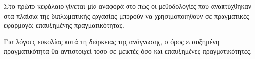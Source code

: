 Στο πρώτο κεφάλαιο γίνεται μία αναφορά στο πώς οι μεθοδολογίες που αναπτύχθηκαν στα πλαίσια της διπλωματικής εργασίας μπορούν να χρησιμοποιηθούν σε πραγματικές εφαρμογές επαυξημένης πραγματικότητας.


Για λόγους ευκολίας κατά τη διάρκειας της ανάγνωσης, ο όρος επαυξημένη πραγματικότητα θα αντιστοιχεί τόσο σε μεικτές όσο και επαυξημένες πραγματικότητες.
